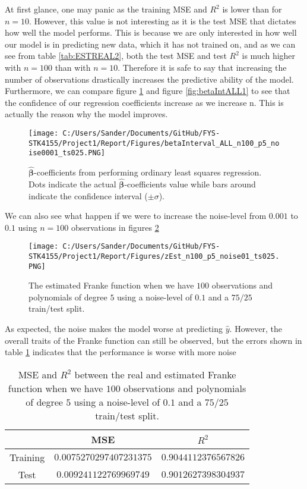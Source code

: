 \documentclass[12pt,a4paper]{article}
\begin{document}
\noindent At first glance, one may panic as the training MSE and $R^2$ is lower than for $n= 10$. However, this value is not interesting as it is the test MSE that dictates how well the model performs. This is because we are only interested in how well our model is in predicting new data, which it has not trained on, and as we can see from table \ref{tab:ESTREAL2}, both the test MSE and test $R^2$ is much higher with $n = 100$ than with $n = 10$. Therefore it is safe to say that increasing the number of observations drastically increases the predictive ability of the model. 
\\
Furthermore, we can compare figure \ref{fig:betaIntALL2} and figure \ref{fig:betaIntALL1} to see that the confidence of our regression coefficients increase as we increase n. This is actually the reason why the model improves.

\begin{figure}[H]
\centering
\texttt{[image: C:/Users/Sander/Documents/GitHub/FYS-STK4155/Project1/Report/Figures/betaInterval\_ALL\_n100\_p5\_noise0001\_ts025.PNG]}
\caption{\label{fig:betaIntALL2} $\hat{\boldsymbol{\beta}}$-coefficients from performing ordinary least squares regression. Dots indicate the actual $\hat{\boldsymbol{\beta}}$-coefficients value while bars around indicate the confidence interval ($\pm \sigma$).}
\end{figure}

\noindent We can also see what happen if we were to increase the noise-level from $0.001$ to $0.1$ using $n = 100$ observations in figures \ref{fig:FrankeEst3}

\begin{figure}[H]
\centering
\texttt{[image: C:/Users/Sander/Documents/GitHub/FYS-STK4155/Project1/Report/Figures/zEst\_n100\_p5\_noise01\_ts025.PNG]}
\caption{\label{fig:FrankeEst3} The estimated Franke function when we have $100$ observations and polynomials of degree $5$ using a noise-level of $0.1$ and a $75/25$ train/test split.}
\end{figure}

\noindent As expected, the noise makes the model worse at predicting $\hat{y}$. However, the overall traits of the Franke function can still be observed, but the errors shown in table \ref{tab:ESTREAL3} indicates that the performance is worse with more noise

\begin{table}[h]
\caption{\label{tab:ESTREAL3} MSE and $R^2$ between the real and estimated Franke function when we have $100$ observations and polynomials of degree $5$ using a noise-level of $0.1$ and a $75/25$ train/test split.}
\centering
\begin{tabular}{c|c|c}
 & MSE & $R^2$\\
\hline
Training & $0.0075270297407231375$ & $0.9044112376567826$\\
\hline
Test & $0.009241122769969749$ & $0.9012627398304937$\\	  
\end{tabular}
\end{table}
\end{document}
